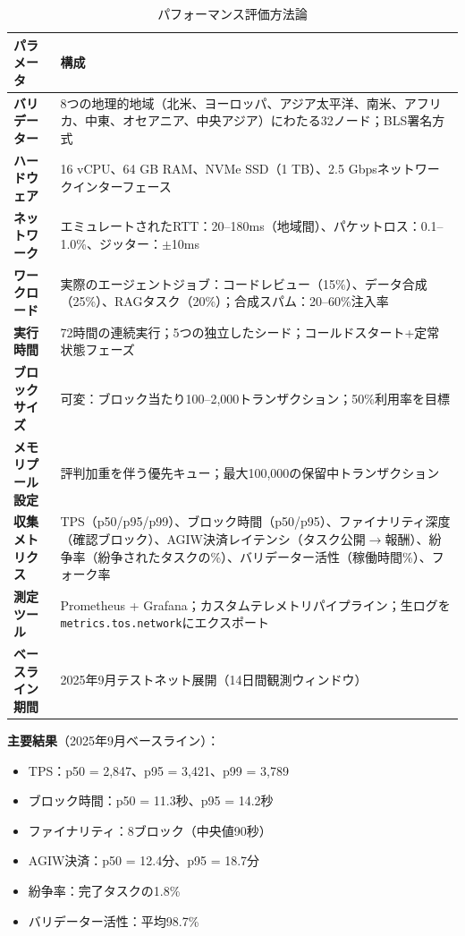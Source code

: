 \documentclass[11pt]{article}
\begin{document}
\begin{table}[H]
\centering
\caption{パフォーマンス評価方法論}
\label{tab:evaluation-methodology}
\begin{tabular}{@{}p{}p{}@{}}
\toprule
\textbf{パラメータ} & \textbf{構成} \\ \midrule
\textbf{バリデーター} & 8つの地理的地域（北米、ヨーロッパ、アジア太平洋、南米、アフリカ、中東、オセアニア、中央アジア）にわたる32ノード；BLS署名方式 \\
\textbf{ハードウェア} & 16 vCPU、64 GB RAM、NVMe SSD（1 TB）、2.5 Gbpsネットワークインターフェース \\
\textbf{ネットワーク} & エミュレートされたRTT：20--180ms（地域間）、パケットロス：0.1--1.0\%、ジッター：$\pm$10ms \\
\textbf{ワークロード} & 実際のエージェントジョブ：コードレビュー（15\%）、データ合成（25\%）、RAGタスク（20\%）；合成スパム：20--60\%注入率 \\
\textbf{実行時間} & 72時間の連続実行；5つの独立したシード；コールドスタート+定常状態フェーズ \\
\textbf{ブロックサイズ} & 可変：ブロック当たり100--2,000トランザクション；50\%利用率を目標 \\
\textbf{メモリプール設定} & 評判加重を伴う優先キュー；最大100,000の保留中トランザクション \\
\textbf{収集メトリクス} & TPS（p50/p95/p99）、ブロック時間（p50/p95）、ファイナリティ深度（確認ブロック）、AGIW決済レイテンシ（タスク公開$\rightarrow$報酬）、紛争率（紛争されたタスクの\%）、バリデーター活性（稼働時間\%）、フォーク率 \\
\textbf{測定ツール} & Prometheus + Grafana；カスタムテレメトリパイプライン；生ログを\texttt{metrics.tos.network}にエクスポート \\
\textbf{ベースライン期間} & 2025年9月テストネット展開（14日間観測ウィンドウ） \\
\bottomrule
\end{tabular}
\end{table}

\textbf{主要結果}（2025年9月ベースライン）：
\begin{itemize}[noitemsep]
  \item TPS：p50 = 2,847、p95 = 3,421、p99 = 3,789
  \item ブロック時間：p50 = 11.3秒、p95 = 14.2秒
  \item ファイナリティ：8ブロック（中央値90秒）
  \item AGIW決済：p50 = 12.4分、p95 = 18.7分
  \item 紛争率：完了タスクの1.8\%
  \item バリデーター活性：平均98.7\%
\end{itemize}
\end{document}

